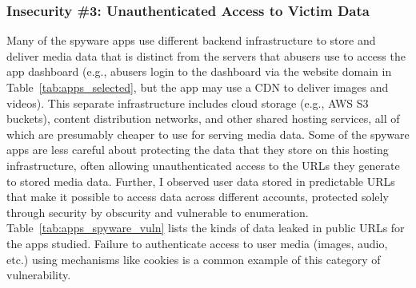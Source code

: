 
\subsubsection*{Insecurity \#3: Unauthenticated Access to Victim Data}
\label{sec:leaky-urls}


Many of the spyware apps use different backend infrastructure to store
and deliver media data that is distinct from the servers that
abusers use to access the app dashboard (e.g., abusers login
to the dashboard via the website domain in Table~\ref{tab:apps_selected}, but
the app may use a CDN to deliver images and videos).
This separate infrastructure
includes cloud storage (e.g., AWS S3 buckets), content distribution
networks, and other shared hosting services, all of which are
presumably cheaper to use for serving media data.
Some of the spyware apps are less careful about protecting the
data that they store on this hosting infrastructure, often allowing
unauthenticated access to the URLs they generate to stored media data.
Further, I observed user data stored in predictable URLs that make it
possible to access data across different accounts, protected solely
through security by obscurity and vulnerable to enumeration. Table~\ref{tab:apps_spyware_vuln} lists
the kinds of data leaked in public URLs for the apps studied. Failure
to authenticate access to user media (images, audio, etc.) using
mechanisms like cookies is a common example of this category of
vulnerability.

